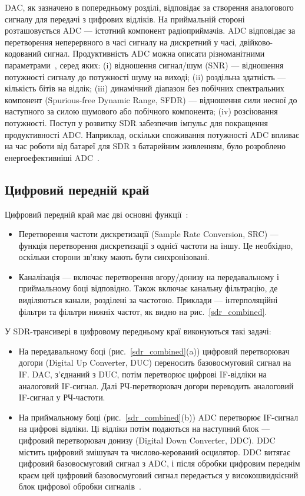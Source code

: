 \documentclass[journal]{IEEEtran}
\begin{document}
DAC, як зазначено в попередньому розділі, відповідає за створення аналогового сигналу для передачі з цифрових відліків. На приймальній стороні розташовується ADC — істотний компонент радіоприймачів. ADC відповідає за перетворення неперервного в часі сигналу на дискретний у часі, двійково-кодований сигнал. Продуктивність ADC можна описати різноманітними параметрами~\cite{Walden1999,Hentschel1999}, серед яких: (i) відношення сигнал/шум (SNR) — відношення потужності сигналу до потужності шуму на виході; (ii) роздільна здатність — кількість бітів на відлік; (iii) динамічний діапазон без побічних спектральних компонент (Spurious-free Dynamic Range, SFDR) — відношення сили несної до наступного за силою шумового або побічного компонента; (iv) розсіювання потужності.
Поступ у розвитку SDR забезпечив імпульс для покращення продуктивності ADC.
Наприклад, оскільки споживання потужності ADC впливає на час роботи від батареї для SDR з батарейним живленням, було розроблено енергоефективніші ADC~\cite{Bowick2011}.

\subsection{Цифровий передній край}

Цифровий передній край має дві основні функції~\cite{Hentschel1999}:
\begin{itemize}
\item Перетворення частоти дискретизації (Sample Rate Conversion, SRC) — функція перетворення дискретизації з однієї частоти на іншу. Це необхідно, оскільки сторони зв'язку мають бути синхронізовані.
\item Каналізація — включає перетворення вгору/донизу на передавальному і приймальному боці відповідно.
Також включає канальну фільтрацію, де виділяються канали, розділені за частотою. Приклади — інтерполяційні фільтри та фільтри нижніх частот, як видно на рис.~\ref{sdr_combined}.
\end{itemize}

У SDR-трансивері в цифровому передньому краї виконуються такі задачі:
\begin{itemize}
\item На передавальному боці (рис.~\ref{sdr_combined}(a)) цифровий перетворювач догори (Digital Up Converter, DUC) переносить базовосмуговий сигнал на IF.
DAC, з'єднаний з DUC, потім перетворює цифрові IF-відліки на аналоговий IF-сигнал.
Далі РЧ-перетворювач догори переводить аналоговий IF-сигнал у РЧ-частоти.
\item На приймальному боці (рис.~\ref{sdr_combined}(b)) ADC перетворює IF-сигнал на цифрові відліки.
Ці відліки потім подаються на наступний блок — цифровий перетворювач донизу (Digital Down Converter, DDC).
DDC містить цифровий змішувач та числово-керований осцилятор.
DDC витягає цифровий базовосмуговий сигнал з ADC, і після обробки цифровим переднім краєм цей цифровий базовосмуговий сигнал передається у високошвидкісний блок цифрової обробки сигналів~\cite{sadiku2004}.
\end{itemize}
\end{document}
